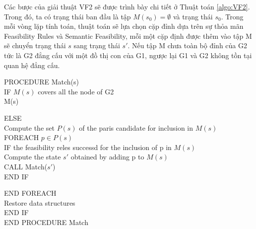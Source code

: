 \documentclass[12pt]{report}
\newenvironment{thuattoan}[1][h]
  {\renewcommand{\algorithmcfname}{Thuật toán}
   \begin{algorithm}[#1]
  }{\end{algorithm}}
\begin{document}
\newpage
\noindent Các bược của giải thuật VF2 \cite{vf2_1368} sẽ được trình bày chi tiết ở Thuật toán \ref{algo:VF2}. Trong đó, ta có trạng thái ban đầu là tập $M(s_0) = \emptyset $ và trạng thái $s_0$. Trong mỗi vòng lặp tính toán, thuật toán sẽ lựa chọn cặp đỉnh dựa trên sự thỏa mãn  Feasibility Rules và Semantic Feasibility, mỗi một cặp định được thêm vào tập M sẽ chuyển trạng thái $s$ sang trạng thái $s'$. Nếu tập M chưa toàn bộ đỉnh của G2 tức là G2 đẳng cấu với một đồ thị con của G1, ngược lại G1 và G2 không tồn tại quan hệ đẳng cấu.
\begin{thuattoan}[!htbp]
	\label{algo:VF2}
	\caption{$VF2$}
	PROCEDURE Match(s)\\
	\hspace{5mm}
	\hspace{5mm}
	\hspace{5mm}IF $M(s)$ covers all the node of G2\\
	\hspace{10mm} \Return M(s)
	
	\hspace{5mm}ELSE\\
	\hspace{10mm} Compute the set $P(s)$ of the paris candidate for inclusion in $M(s)$\\
	\hspace{10mm} FOREACH	$p \in P(s)$ \\
	\hspace{10mm} IF the feasibility reles successd for the inclusion of p in $M(s)$\\
	\hspace{20mm} Compute the state $s'$ obtained by adding p to $M(s)$\\
	\hspace{20mm} CALL Match($s'$)\\
	
	\hspace{15mm} END IF
	
	\hspace{10mm}END FOREACH\\
	\hspace{10mm}Restore data structures\\
	\hspace{5mm}END IF\\
	END PROCEDURE Match
\end{thuattoan}
\end{document}
